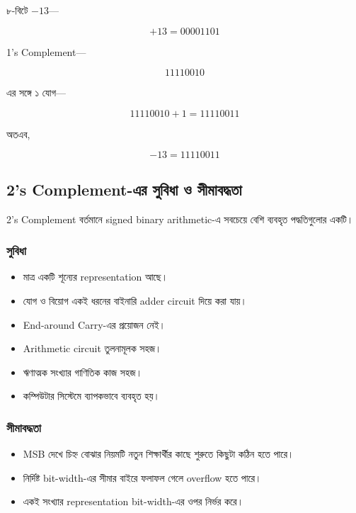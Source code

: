 ৮-বিটে $-13$—

\[
+13=00001101
\]

\textenglish{1's Complement}—

\[
11110010
\]

এর সঙ্গে ১ যোগ—

\[
11110010+1=11110011
\]

অতএব,

\[
\boxed{-13=11110011}
\]


\subsection{\textenglish{2's Complement}-এর সুবিধা ও সীমাবদ্ধতা}

\textenglish{2's Complement} বর্তমানে
\textenglish{signed binary arithmetic}-এ সবচেয়ে বেশি ব্যবহৃত
পদ্ধতিগুলোর একটি।

\subsubsection*{সুবিধা}

\begin{itemize}[label={{\bulletfont\textbullet}}, leftmargin=*, nosep]
    \item মাত্র একটি শূন্যের \textenglish{representation} আছে।
    \item যোগ ও বিয়োগ একই ধরনের বাইনারি
    \textenglish{adder circuit} দিয়ে করা যায়।
    \item \textenglish{End-around Carry}-এর প্রয়োজন নেই।
    \item \textenglish{Arithmetic circuit} তুলনামূলক সহজ।
    \item ঋণাত্মক সংখ্যার গাণিতিক কাজ সহজ।
    \item কম্পিউটার সিস্টেমে ব্যাপকভাবে ব্যবহৃত হয়।
\end{itemize}

\subsubsection*{সীমাবদ্ধতা}

\begin{itemize}[label={{\bulletfont\textbullet}}, leftmargin=*, nosep]
    \item \textenglish{MSB} দেখে চিহ্ন বোঝার নিয়মটি
    নতুন শিক্ষার্থীর কাছে শুরুতে কিছুটা কঠিন হতে পারে।
    \item নির্দিষ্ট \textenglish{bit-width}-এর সীমার বাইরে
    ফলাফল গেলে \textenglish{overflow} হতে পারে।
    \item একই সংখ্যার \textenglish{representation}
    \textenglish{bit-width}-এর ওপর নির্ভর করে।
\end{itemize}

